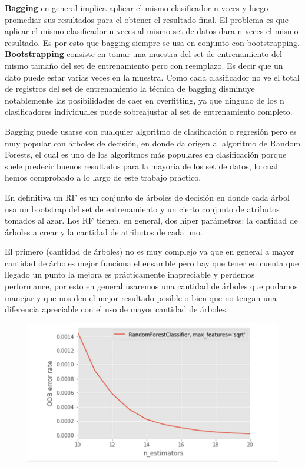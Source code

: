\documentclass[a4paper,10pt]{article}
\begin{document}
\textbf{Bagging} en general implica aplicar el mismo clasificador n veces y luego promediar sus resultados para el obtener el resultado final. El problema es que aplicar el mismo clasificador n veces al mismo set de datos dara n veces el mismo resultado. Es por esto que bagging siempre se usa en conjunto con bootstrapping. \\

\textbf{Bootstrapping} consiste en tomar una muestra del set de entrenamiento del mismo tamaño del set de entrenamiento pero con reemplazo. Es decir que un dato puede estar varias veces en la muestra. Como cada clasificador no ve el total de registros del set de entrenamiento la técnica de bagging disminuye notablemente las posibilidades de caer en overfitting, ya que ninguno de los n clasificadores individuales puede sobreajustar al set de entrenamiento completo.

Bagging puede usarse con cualquier algoritmo de clasificación o regresión pero es muy popular con árboles de decisión, en donde da origen al algoritmo de Random Forests, el cual es uno de los algoritmos más populares en clasificación porque suele predecir buenos resultados para la mayoría de los set de datos, lo cual hemos comprobado a lo largo de este trabajo práctico.

\medskip

En definitiva un RF es un conjunto de árboles de decisión en donde cada árbol usa un bootstrap del set de entrenamiento y un cierto conjunto de atributos tomados al azar. Los RF tienen, en general, dos hiper parámetros: la cantidad de árboles a crear y la cantidad de atributos de cada uno. 

El primero (cantidad de árboles) no es muy complejo ya que en general a mayor cantidad de árboles mejor funciona el ensamble pero hay que tener en cuenta que llegado un punto la mejora es prácticamente inapreciable y perdemos performance, por esto en general usaremos una cantidad de árboles que podamos manejar y que nos den el mejor resultado posible o bien que no tengan una diferencia apreciable con el uso de mayor cantidad de árboles.

\begin{figure}[!htp]
\centering
\includegraphics[scale=0.6]{Wireshark/OOB_1.png} 
\caption{}
\end{figure}
\end{document}

